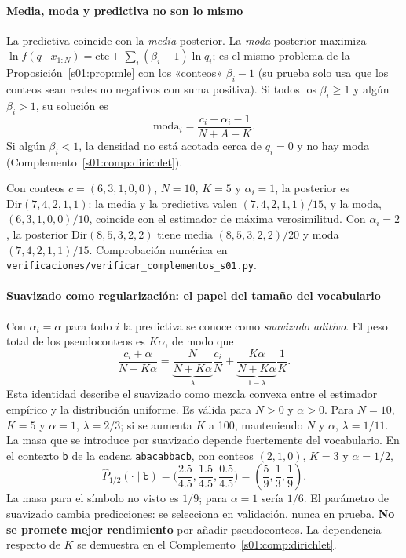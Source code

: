 \paragraph{Media, moda y predictiva no son lo mismo}
La predictiva coincide con la \emph{media} posterior. La \emph{moda} posterior
maximiza $\ln f(q\mid x_{1:N})=\text{cte}+\sum_i(\beta_i-1)\ln q_i$; es el mismo
problema de la Proposición~\ref{s01:prop:mle} con los «conteos» $\beta_i-1$ (su
prueba solo usa que los conteos sean reales no negativos con suma positiva). Si
todos los $\beta_i\ge1$ y algún $\beta_i>1$, su solución es
\[
\text{moda}_i=\frac{c_i+\alpha_i-1}{N+A-K}.
\]
Si algún $\beta_i<1$, la densidad no está acotada cerca de $q_i=0$ y no hay moda
(Complemento~\ref{s01:comp:dirichlet}).
\begin{ejemplo}
Con conteos $c=(6,3,1,0,0)$, $N=10$, $K=5$ y $\alpha_i=1$, la posterior es
$\mathrm{Dir}(7,4,2,1,1)$: la media y la predictiva valen $(7,4,2,1,1)/15$, y la
moda, $(6,3,1,0,0)/10$, coincide con el estimador de máxima verosimilitud. Con
$\alpha_i=2$, la posterior $\mathrm{Dir}(8,5,3,2,2)$ tiene media $(8,5,3,2,2)/20$ y
moda $(7,4,2,1,1)/15$. Comprobación numérica en
\nolinkurl{verificaciones/verificar_complementos_s01.py}.
\end{ejemplo}
\paragraph{Suavizado como regularización: el papel del tamaño del vocabulario}
Con $\alpha_i=\alpha$ para todo $i$ la predictiva se conoce como \emph{suavizado
aditivo}. El peso total de los pseudoconteos es $K\alpha$, de modo que
\[
\frac{c_i+\alpha}{N+K\alpha}
=\underbrace{\frac{N}{N+K\alpha}}_{\lambda}\frac{c_i}{N}
 +\underbrace{\frac{K\alpha}{N+K\alpha}}_{1-\lambda}\frac1K.
\]
Esta identidad describe el suavizado como mezcla convexa entre el estimador
empírico y la distribución uniforme. Es válida para $N>0$ y $\alpha>0$.
Para $N=10$, $K=5$ y $\alpha=1$, $\lambda=2/3$; si se aumenta
$K$ a 100, manteniendo $N$ y $\alpha$, $\lambda=1/11$. La masa que
se introduce por suavizado depende fuertemente del vocabulario.
En el contexto \texttt{b} de la cadena \texttt{abacabbacb}, con conteos $(2,1,0)$,
$K=3$ y $\alpha=1/2$,
\[
\widehat P_{1/2}(\cdot\mid\texttt{b})=\biggl(\frac{2.5}{4.5},\frac{1.5}{4.5},
\frac{0.5}{4.5}\biggr)=\left(\frac59,\frac13,\frac19\right).
\]
La masa para el símbolo no visto es $1/9$; para $\alpha=1$ sería $1/6$.
El parámetro de suavizado cambia predicciones: se selecciona en validación,
nunca en prueba. \textbf{No se promete mejor rendimiento} por añadir
pseudoconteos. La dependencia respecto de $K$ se demuestra en el
Complemento~\ref{s01:comp:dirichlet}.

